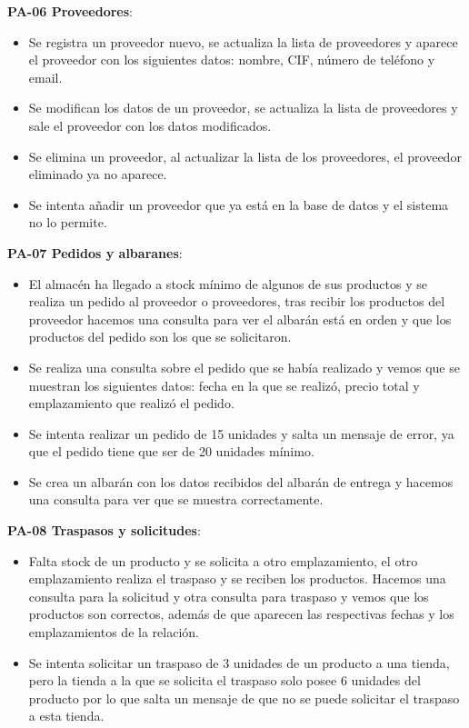 \textbf{PA-06 Proveedores}:
\begin{itemize}
	\item Se registra un proveedor nuevo, se actualiza la lista de proveedores y aparece el proveedor con los siguientes datos: nombre, CIF, número de teléfono y email.
	\item Se modifican los datos de un proveedor, se actualiza la lista de proveedores y sale el proveedor con los datos modificados.
	\item Se elimina un proveedor, al actualizar la lista de los proveedores, el proveedor eliminado ya no aparece.
	\item Se intenta añadir un proveedor que ya está en la base de datos y el sistema no lo permite.
\end{itemize}

\textbf{PA-07 Pedidos y albaranes}:
\begin{itemize}
	\item El almacén ha llegado a stock mínimo de algunos de sus productos y se realiza un pedido al proveedor o proveedores, tras recibir los productos del proveedor hacemos una consulta para ver el albarán está en orden y que los productos del pedido son los que se solicitaron.
	\item Se realiza una consulta sobre el pedido que se había realizado y vemos que se muestran los siguientes datos: fecha en la que se realizó, precio total y emplazamiento que realizó el pedido.
	\item Se intenta realizar un pedido de 15 unidades y salta un mensaje de error, ya que el pedido tiene que ser de 20 unidades mínimo.
	\item Se crea un albarán con los datos recibidos del albarán de entrega y hacemos una consulta para ver que se muestra correctamente.
\end{itemize}

\textbf{PA-08 Traspasos y solicitudes}:
\begin{itemize}
	\item Falta stock de un producto y se solicita a otro emplazamiento, el otro emplazamiento realiza el traspaso y se reciben los productos. Hacemos una consulta para la solicitud y otra consulta para traspaso y vemos que los productos son correctos, además de que aparecen las respectivas fechas y los emplazamientos de la relación.
	\item Se intenta solicitar un traspaso de 3 unidades de un producto a una tienda, pero la tienda a la que se solicita el traspaso solo posee 6 unidades del producto por lo que salta un mensaje de que no se puede solicitar el traspaso a esta tienda.
\end{itemize}

